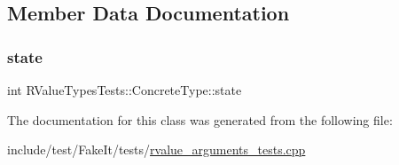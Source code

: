 \subsection{Member Data Documentation}
\mbox{\label{classRValueTypesTests_1_1ConcreteType_afedad533fe3cd0067098511c14c2e46e}} 
\subsubsection{\texorpdfstring{state}{state}}
{\footnotesize\ttfamily int R\+Value\+Types\+Tests\+::\+Concrete\+Type\+::state}



The documentation for this class was generated from the following file\+:\begin{DoxyCompactItemize}
\item 
include/test/\+Fake\+It/tests/\mbox{\hyperlink{rvalue__arguments__tests_8cpp}{rvalue\+\_\+arguments\+\_\+tests.\+cpp}}\end{DoxyCompactItemize}
